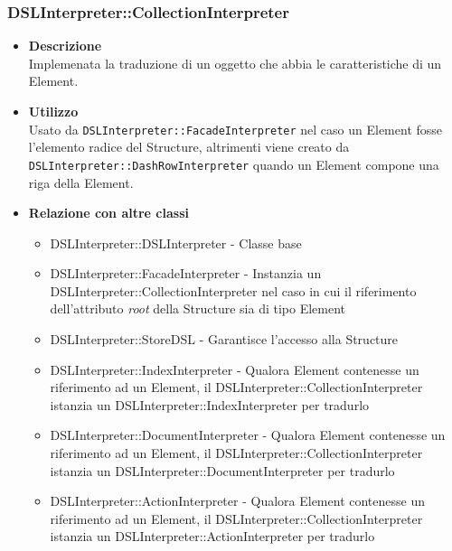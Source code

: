 \subsubsection{DSLInterpreter::CollectionInterpreter}
\begin{itemize}
\item \textbf{Descrizione} \hfill \\
Implemenata la traduzione di un oggetto che abbia le caratteristiche di un  Element.
\item \textbf{Utilizzo} \hfill \\
  Usato da \texttt{DSLInterpreter::FacadeInterpreter} \newline nel caso un  Element fosse l'elemento radice del  Structure, altrimenti viene creato da \texttt{DSLInterpreter::DashRowInterpreter} \newline quando un  Element compone una riga della  Element.
\item \textbf{Relazione con altre classi}
\begin{itemize}
\item DSLInterpreter::DSLInterpreter - Classe base
\item DSLInterpreter::FacadeInterpreter - Instanzia un DSLInterpreter::CollectionInterpreter nel caso in cui il riferimento dell'attributo \textit{root} della  Structure sia di tipo  Element 
\item DSLInterpreter::StoreDSL - Garantisce l'accesso alla  Structure
\item DSLInterpreter::IndexInterpreter - Qualora  Element contenesse un riferimento ad un  Element, il DSLInterpreter::CollectionInterpreter istanzia un DSLInterpreter::IndexInterpreter per tradurlo
\item DSLInterpreter::DocumentInterpreter - Qualora  Element contenesse un riferimento ad un  Element, il DSLInterpreter::CollectionInterpreter istanzia un DSLInterpreter::DocumentInterpreter per tradurlo
\item DSLInterpreter::ActionInterpreter - Qualora  Element contenesse un riferimento ad un  Element, il DSLInterpreter::CollectionInterpreter istanzia un DSLInterpreter::ActionInterpreter per tradurlo
\end{itemize}
\end{itemize}

